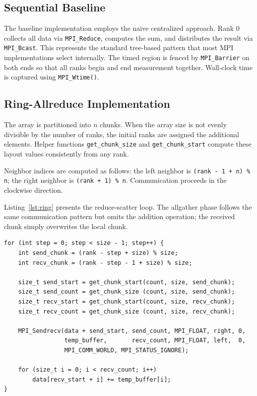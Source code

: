 \documentclass[12pt,a4paper]{article}
\begin{document}
\subsection{Sequential Baseline}

The baseline implementation employs the naive centralized approach. Rank 0 collects all data via \texttt{MPI\_Reduce}, computes the sum, and distributes the result via \texttt{MPI\_Bcast}. This represents the standard tree-based pattern that most MPI implementations select internally. The timed region is fenced by \texttt{MPI\_Barrier} on both ends so that all ranks begin and end measurement together. Wall-clock time is captured using \texttt{MPI\_Wtime()}.

\subsection{Ring-Allreduce Implementation}

The array is partitioned into $n$ chunks. When the array size is not evenly divisible by the number of ranks, the initial ranks are assigned the additional elements. Helper functions \texttt{get\_chunk\_size} and \texttt{get\_chunk\_start} compute these layout values consistently from any rank.

Neighbor indices are computed as follows: the left neighbor is \texttt{(rank - 1 + n) \% n}; the right neighbor is \texttt{(rank + 1) \% n}. Communication proceeds in the clockwise direction.

Listing~\ref{lst:ring} presents the reduce-scatter loop. The allgather phase follows the same communication pattern but omits the addition operation; the received chunk simply overwrites the local chunk.

\begin{lstlisting}[caption={Reduce-scatter loop in src/ring\_allreduce.c},label={lst:ring}]
for (int step = 0; step < size - 1; step++) {
    int send_chunk = (rank - step + size) % size;
    int recv_chunk = (rank - step - 1 + size) % size;

    size_t send_start = get_chunk_start(count, size, send_chunk);
    size_t send_count = get_chunk_size (count, size, send_chunk);
    size_t recv_start = get_chunk_start(count, size, recv_chunk);
    size_t recv_count = get_chunk_size (count, size, recv_chunk);

    MPI_Sendrecv(data + send_start, send_count, MPI_FLOAT, right, 0,
                 temp_buffer,       recv_count, MPI_FLOAT, left,  0,
                 MPI_COMM_WORLD, MPI_STATUS_IGNORE);

    for (size_t i = 0; i < recv_count; i++)
        data[recv_start + i] += temp_buffer[i];
}
\end{lstlisting}
\end{document}
